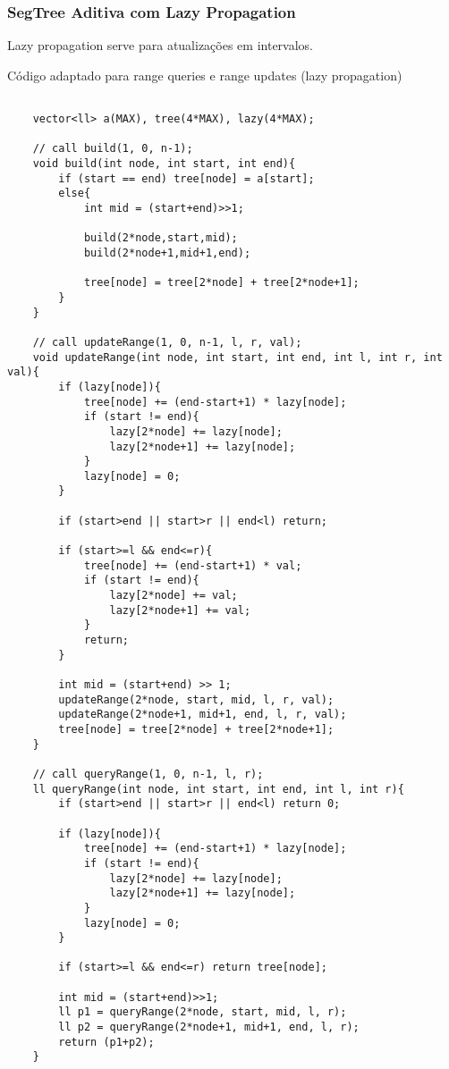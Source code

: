 \subsubsection{SegTree Aditiva com Lazy Propagation}
\par Lazy propagation serve para atualizações em intervalos.
\par Código adaptado para range queries e range updates (lazy propagation)
\begin{verbatim}

    vector<ll> a(MAX), tree(4*MAX), lazy(4*MAX);

    // call build(1, 0, n-1);
    void build(int node, int start, int end){
        if (start == end) tree[node] = a[start];
        else{
            int mid = (start+end)>>1;
    
            build(2*node,start,mid);
            build(2*node+1,mid+1,end);
    
            tree[node] = tree[2*node] + tree[2*node+1];
        }
    }

    // call updateRange(1, 0, n-1, l, r, val);
    void updateRange(int node, int start, int end, int l, int r, int val){
        if (lazy[node]){
            tree[node] += (end-start+1) * lazy[node];
            if (start != end){
                lazy[2*node] += lazy[node];
                lazy[2*node+1] += lazy[node];
            }
            lazy[node] = 0;
        }
    
        if (start>end || start>r || end<l) return;
    
        if (start>=l && end<=r){
            tree[node] += (end-start+1) * val;
            if (start != end){
                lazy[2*node] += val;
                lazy[2*node+1] += val;
            }
            return;
        }
    
        int mid = (start+end) >> 1;
        updateRange(2*node, start, mid, l, r, val);
        updateRange(2*node+1, mid+1, end, l, r, val);
        tree[node] = tree[2*node] + tree[2*node+1];
    }

    // call queryRange(1, 0, n-1, l, r);
    ll queryRange(int node, int start, int end, int l, int r){
        if (start>end || start>r || end<l) return 0;
    
        if (lazy[node]){
            tree[node] += (end-start+1) * lazy[node];
            if (start != end){
                lazy[2*node] += lazy[node];
                lazy[2*node+1] += lazy[node];
            }
            lazy[node] = 0;
        }
    
        if (start>=l && end<=r) return tree[node];
    
        int mid = (start+end)>>1;
        ll p1 = queryRange(2*node, start, mid, l, r);
        ll p2 = queryRange(2*node+1, mid+1, end, l, r);
        return (p1+p2);
    }
\end{verbatim}

